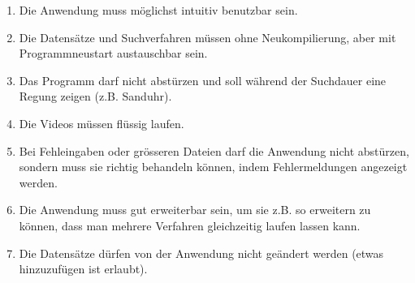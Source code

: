 \begin{enumerate}[label=\bfseries /NF \arabic*0/]
  \item Die Anwendung muss möglichst intuitiv benutzbar sein.
  \item Die Datensätze und Suchverfahren müssen ohne Neukompilierung, aber mit Programmneustart austauschbar sein.
  \item Das Programm darf nicht abstürzen und soll während der Suchdauer eine Regung zeigen (z.B. Sanduhr).
  \item Die Videos müssen flüssig laufen.	%
  \item Bei Fehleingaben oder grösseren Dateien darf die Anwendung nicht abstürzen, sondern muss sie richtig behandeln können, indem Fehlermeldungen angezeigt werden.
  \item Die Anwendung muss gut erweiterbar sein, um sie z.B. so erweitern zu können, dass man mehrere Verfahren gleichzeitig laufen lassen kann.
  \item Die Datensätze dürfen von der Anwendung nicht geändert werden (etwas hinzuzufügen ist erlaubt).
\end{enumerate}
